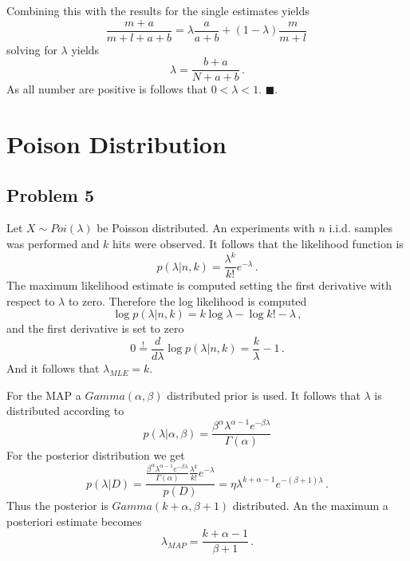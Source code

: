 \documentclass{scrartcl}
\newcommand{\qed}{\hfill $\blacksquare$}
\begin{document}
Combining this with the results for the single estimates yields
\begin{equation}
	\frac{m+a}{m+l+a+b} = \lambda \frac{a}{a+b} + (1-\lambda) \frac{m}{m+l} \, 
\end{equation}
solving for $\lambda$ yields
\begin{equation}
	\lambda = \frac{b+a}{N+a+b} \, .
\end{equation}
As all number are positive is follows that $0 < \lambda < 1$. \qed.

\section{Poison Distribution}
\subsection{Problem 5}
Let $X \sim Poi(\lambda)$ be Poisson distributed. An experiments with $n$ i.i.d. samples was performed and $k$ hits were observed.
It follows that the likelihood function is
\begin{equation}
	p(\lambda | n, k) = \frac{\lambda^k}{k!} e^{-\lambda} \, .
\end{equation}
The maximum likelihood estimate is computed setting the first derivative with respect to $\lambda$ to zero. Therefore the log likelihood is computed
\begin{equation}
	\log p(\lambda | n, k) = k \log \lambda - \log k! - \lambda \, ,
\end{equation}
and the first derivative is set to zero
\begin{equation}
	0 \overset{!}{=} \frac{d}{d\lambda}\log p(\lambda | n, k) = \frac{k}{\lambda} - 1 \, .
\end{equation}
And it follows that $\lambda_{MLE} = k$.

For the MAP a $Gamma(\alpha, \beta)$ distributed prior is used. It follows that $\lambda$ is distributed according to
\begin{equation}
	p(\lambda | \alpha, \beta) = \frac{\beta^\alpha \lambda^{\alpha-1}e^{-\beta \lambda}}{\Gamma(\alpha)}
\end{equation}
For the posterior distribution we get
\begin{equation}
	p(\lambda | D) = \frac{\frac{\beta^\alpha \lambda^{\alpha-1} e^{-\beta \lambda}}{\Gamma (\alpha)} \frac{\lambda^k}{k!}e^{-\lambda}}{p(D)} = \eta \lambda^{k+\alpha-1} e^{-(\beta+1)\lambda} \, .
\end{equation}
Thus the posterior is $Gamma(k+\alpha, \beta+1)$ distributed. An the maximum a posteriori estimate becomes
\begin{equation}
	\lambda_{MAP} = \frac{k+\alpha-1}{\beta+1} \, .
\end{equation}
\end{document}
